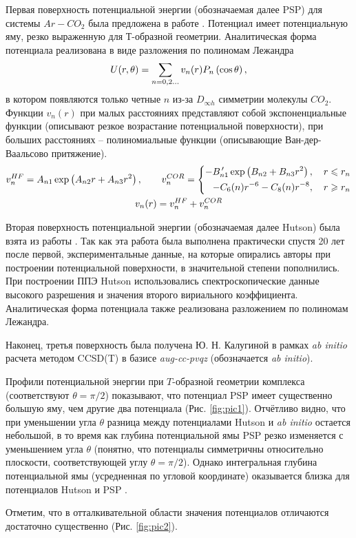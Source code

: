 Первая поверхность потенциальной энергии (обозначаемая далее PSP) для системы $Ar-CO_2$ была предложена в работе \cite{parker1976}. Потенциал имеет потенциальную яму, резко выраженную для Т-образной геометрии. Аналитическая форма потенциала реализована в виде разложения по полиномам Лежандра
\vverh
\begin{gather}
	U(r, \theta) = \sum_{n = 0, 2 \dots} v_n(r) P_n \left( \cos \theta \right), \notag
\end{gather}
в котором появляются только четные $n$ из-за $D_{\infty h}$ симметрии молекулы $CO_2$. Функции $v_n(r)$ при малых расстояниях представляют собой экспоненциальные функции (описывают резкое возрастание потенциальной поверхности), при больших расстояниях -- полиномиальные функции (описывающие Ван-дер-Ваальсово притяжение). 
\vverh
\begin{gather}
	v_n^{HF} = A_{n1} \exp \left( A_{n2} r + A_{n3} r^2 \right), \notag \quad \quad 
	v_n^{COR} = \left\{
	\begin{aligned}
		- B_{n1}^{\, \prime} \exp \left( B_{n2} + B_{n3} r^2 \right), \quad r \leqslant r_n \\
		-C_6(n) r^{-6} - C_8(n) r^{-8}, \quad r \geqslant r_n
	\end{aligned} \right. \notag \\
	v_n(r) = v_n^{HF} + v_n^{COR} \notag 
\end{gather}

Вторая поверхность потенциальной энергии (обозначаемая далее Hutson) была взята из работы \cite{hutson1996}. Так как эта работа была выполнена практически спустя 20 лет после первой, экспериментальные данные, на которые опирались авторы при построении потенциальной поверхности, в значительной степени пополнились. При построении ППЭ Hutson использовались спектроскопические данные высокого разрешения и значения второго вириального коэффициента. Аналитическая форма потенциала также реализована разложением по полиномам Лежандра.  

Наконец, третья поверхность была получена Ю. Н. Калугиной в рамках \textit{ab initio} расчета методом CCSD(T) в базисе \textit{aug-cc-pvqz} \cite{kalugina2017} (обозначается \textit{ab initio}).

Профили потенциальной энергии при $T$-образной геометрии комплекса (соответствуют $\theta = \pi / 2$) показывают, что потенциал PSP имеет существенно большую яму, чем другие два потенциала (Рис. \ref{fig:pic1}). Отчётливо видно, что при уменьшении угла $\theta$ разница между потенциалами Hutson и \textit{ab initio} остается небольшой, в то время как глубина потенциальной ямы PSP резко изменяется с уменьшением угла $\theta$ (понятно, что потенциалы симметричны относительно плоскости, соответствующей углу $\theta = \pi / 2$). Однако интегральная глубина потенциальной ямы (усредненная по угловой координате) оказывается близка для потенциалов Hutson и PSP \cite{hutson1996}. \par
Отметим, что в отталкивательной области значения потенциалов отличаются достаточно существенно (Рис. \ref{fig:pic2}).

